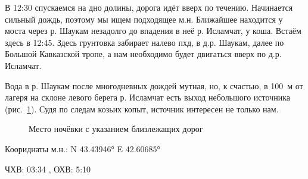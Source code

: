 В 12:30 спускаемся на дно долины, дорога идёт вверх по течению. Начинается сильный дождь, поэтому мы ищем подходящее м.н. Ближайшее находится у моста через р. Шаукам незадолго до впадения в неё р. Исламчат, у коша. Встаём здесь в 12:45. Здесь грунтовка забирает налево пхд, в д.р. Шаукам, далее по Большой Кавказской тропе, а нам необходимо будет двигаться вверх по д.р. Исламчат.

Вода в р. Шаукам после многодневных дождей мутная, но, к счастью, в 100~м от лагеря на склоне левого берега р. Исламчат есть выход небольшого источника (рис.~\ref{fig:mn910}). Судя по следам козьих копыт, источник интересен не только нам.

\begin{figure}[h!]
	\centering
	\caption{Место ночёвки с указанием близлежащих дорог}
	\label{fig:mn910}
\end{figure}

Коориднаты м.н.: N 43.43946° E 42.60685°

ЧХВ: 03:34 , ОХВ: 5:10
\clearpage
